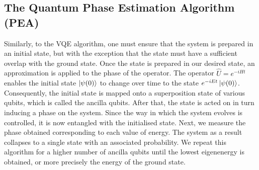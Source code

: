 \documentclass[12pt]{article}
\begin{document}
\subsection{The Quantum Phase Estimation Algorithm (PEA)}
Similarly, to the VQE algorithm, one must ensure that the system is prepared in an initial state, but with the exception that the state must have a
 sufficient overlap with the ground state. Once the state is prepared in our desired state, an approximation is applied to the phase of the operator.
  The operator $\hat{U} = e^{-iHt}$ enables the initial state $\ket{\psi(0)}$ to change over time to the state $e^{-iEt}\ket{\psi(0)}$. Consequently,
  the initial state is mapped onto a superposition state of various qubits, which is called the ancilla qubits. After that, the state is acted on in
  turn inducing a phase on the system. Since the way in which the system evolves is controlled, it is now entangled with the initialised state.
 Next, we measure the phase obtained corresponding to each value of energy. The system as a result collapses to a single state with an associated
 probability. We repeat this algorithm for a higher number of ancilla qubits \cite[p.2]{tansuwannont2015quantum} until the lowest eigenenergy is
  obtained, or more precisely the energy of the ground state.\\

\noindent\setlength{\fboxsep}{0.5em}
\\
\end{document}
